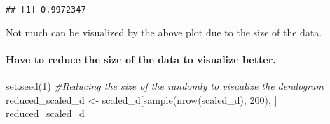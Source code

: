 \documentclass[
]{article}
\newenvironment{Shaded}{\begin{snugshade}}{\end{snugshade}}
\newcommand{\CommentTok}[1]{\textcolor[rgb]{0.56,0.35,0.01}{\textit{#1}}}
\newcommand{\DecValTok}[1]{\textcolor[rgb]{0.00,0.00,0.81}{#1}}
\newcommand{\FunctionTok}[1]{\textcolor[rgb]{0.00,0.00,0.00}{#1}}
\newcommand{\NormalTok}[1]{#1}
\newcommand{\OtherTok}[1]{\textcolor[rgb]{0.56,0.35,0.01}{#1}}
\begin{document}
\begin{verbatim}
## [1] 0.9972347
\end{verbatim}

Not much can be visualized by the above plot due to the size of the
data.

\hypertarget{have-to-reduce-the-size-of-the-data-to-visualize-better.}{%
\paragraph{Have to reduce the size of the data to visualize
better.}\label{have-to-reduce-the-size-of-the-data-to-visualize-better.}}

\begin{Shaded}
\begin{Highlighting}[]
\FunctionTok{set.seed}\NormalTok{(}\DecValTok{1}\NormalTok{)}
\CommentTok{\#Reducing the size of the randomly to visualize the dendogram}
\NormalTok{reduced\_scaled\_d }\OtherTok{\textless{}{-}}\NormalTok{ scaled\_d[}\FunctionTok{sample}\NormalTok{(}\FunctionTok{nrow}\NormalTok{(scaled\_d), }\DecValTok{200}\NormalTok{), ]}
\NormalTok{reduced\_scaled\_d}
\end{Highlighting}
\end{Shaded}
\end{document}

